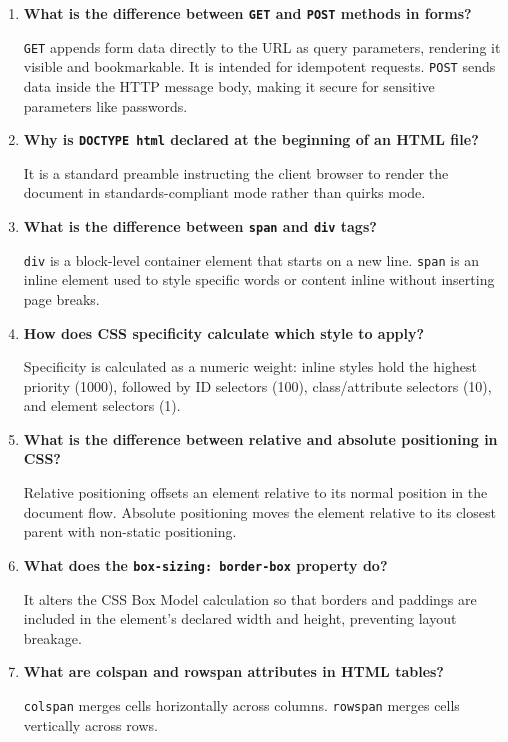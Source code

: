 \documentclass[12pt,a4paper]{article}
\newcommand{\Q}[1]{\textbf{#1}\par\noindent\ignorespaces}
\begin{document}
\begin{tcolorbox}[exambox, title={\textbf{Frequently Asked / Viva Questions}}]
\begin{enumerate}[leftmargin=*, label=\textbf{Q\arabic*.}, itemsep=5pt]
  \item \Q{What is the difference between \texttt{GET} and \texttt{POST} methods in forms?}
        \texttt{GET} appends form data directly to the URL as query parameters, rendering it visible and bookmarkable. It is intended for idempotent requests. \texttt{POST} sends data inside the HTTP message body, making it secure for sensitive parameters like passwords.
        
  \item \Q{Why is \texttt{DOCTYPE html} declared at the beginning of an HTML file?}
        It is a standard preamble instructing the client browser to render the document in standards-compliant mode rather than quirks mode.
        
  \item \Q{What is the difference between \texttt{span} and \texttt{div} tags?}
        \texttt{div} is a block-level container element that starts on a new line. \texttt{span} is an inline element used to style specific words or content inline without inserting page breaks.
        
  \item \Q{How does CSS specificity calculate which style to apply?}
        Specificity is calculated as a numeric weight: inline styles hold the highest priority (1000), followed by ID selectors (100), class/attribute selectors (10), and element selectors (1).
        
  \item \Q{What is the difference between relative and absolute positioning in CSS?}
        Relative positioning offsets an element relative to its normal position in the document flow. Absolute positioning moves the element relative to its closest parent with non-static positioning.
        
  \item \Q{What does the \texttt{box-sizing: border-box} property do?}
        It alters the CSS Box Model calculation so that borders and paddings are included in the element's declared width and height, preventing layout breakage.
        
  \item \Q{What are colspan and rowspan attributes in HTML tables?}
        \texttt{colspan} merges cells horizontally across columns. \texttt{rowspan} merges cells vertically across rows.
        

\end{enumerate}
\end{tcolorbox}
\end{document}
